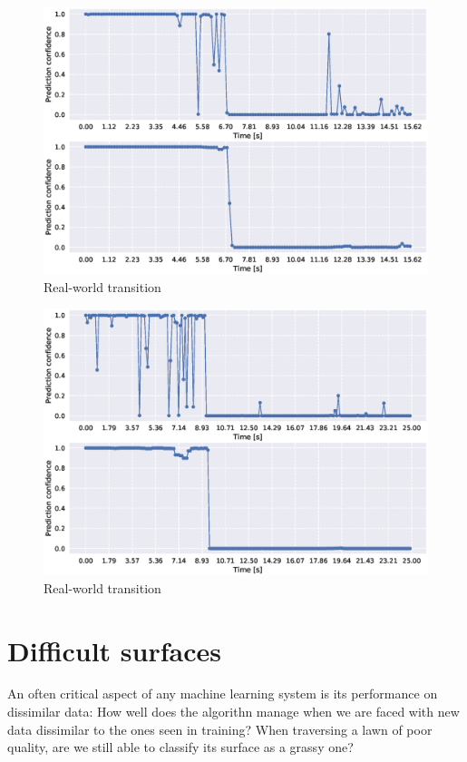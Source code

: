 \begin{figure}
	\centering
	\includegraphics[scale=0.5]{figs_temp/transition_grass_gravel2}
	\caption{Real-world transition}
\end{figure}

\begin{figure}
	\centering
	\includegraphics[scale=0.5]{figs_temp/transition_grass_gravel}
	\caption{Real-world transition}
\end{figure}

\section{Difficult surfaces}

An often critical aspect of any machine learning system is its performance on dissimilar data: How well does the algorithn manage when we are faced with new data dissimilar to the ones seen in training? When traversing a lawn of poor quality, are we still able to classify its surface as a grassy one?  

